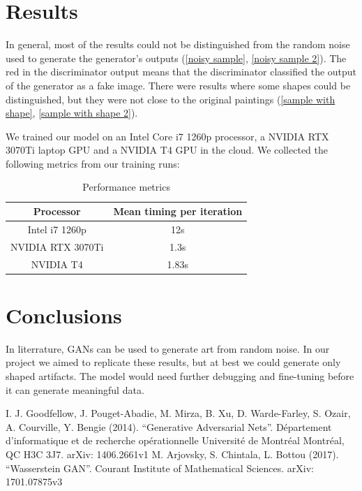 \documentclass[conference]{IEEEtran}
\begin{document}
\section{Results} \label{Results}
    In general, most of the results could not be distinguished from the random noise used to generate the generator's outputs
(\ref{noisy sample}, \ref{noisy sample 2}). The red in the discriminator output means that the discriminator classified the
output of the generator as a fake image. There were results where some shapes could be distinguished, but they were not close
to the original paintings (\ref{sample with shape}, \ref{sample with shape 2}).

    We trained our model on an Intel Core i7 1260p processor, a NVIDIA RTX 3070Ti laptop GPU and a NVIDIA T4 GPU in the cloud.
We collected the following metrics from our training runs:

\begin{table}[!h]
    \centering
    \begin{tabular}{|c|c|}
        \hline
        Processor & Mean timing per iteration \\
        \hline
        Intel i7 1260p & 12s \\
        NVIDIA RTX 3070Ti & 1.3s \\
        NVIDIA T4 & 1.83s \\
        \hline
    \end{tabular}
    \caption{Performance metrics} \label{performance metrics}
\end{table}

\section{Conclusions}
    In literrature, GANs can be used to generate art from random noise. In our project we aimed to replicate these results,
but at best we could generate only shaped artifacts. The model would need further debugging and fine-tuning before it can
generate meaningful data.

\begin{thebibliography}{00}
     I. J. Goodfellow, J. Pouget-Abadie, M. Mirza, B. Xu, D. Warde-Farley, S. Ozair, A. Courville, Y. Bengie
    (2014). ``Generative Adversarial Nets''. Département d'informatique et de recherche opérationnelle Université de Montréal
    Montréal, QC H3C 3J7. arXiv: 1406.2661v1
     M. Arjovsky, S. Chintala, L. Bottou (2017). ``Wasserstein GAN''. Courant Institute of Mathematical Sciences.
    arXiv: 1701.07875v3
\end{thebibliography}
\end{document}
